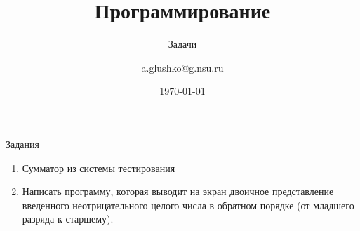 \documentclass[aspectratio=169,14pt]{beamer}
\title{Программирование}
\subtitle{Задачи}
\author{a.glushko@g.nsu.ru}
\date{\today}
\begin{document}
    \begin{frame}
        \titlepage
    \end{frame}

    \begin{frame}{Задания}
        \begin{enumerate}
            \item Сумматор из системы тестирования
            \item Написать программу, которая выводит на экран двоичное представление введенного неотрицательного целого числа в обратном порядке (от младшего разряда к старшему).
        \end{enumerate}
    \end{frame}
\end{document}
